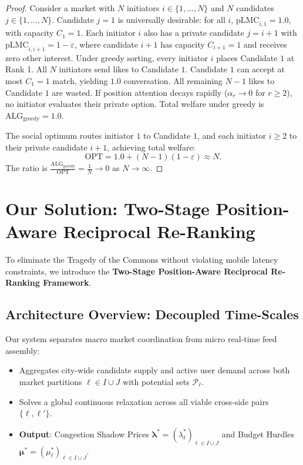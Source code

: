 \documentclass[11pt,letterpaper]{article}
\theoremstyle{definition}
\theoremstyle{plain}
\theoremstyle{remark}
\begin{document}
\begin{proof}
Consider a market with $N$ initiators $i \in \{1, \dots, N\}$ and $N$ candidates $j \in \{1, \dots, N\}$. 
Candidate $j=1$ is universally desirable: for all $i$, $\mathrm{pLMC}_{i, 1} = 1.0$, with capacity $C_1 = 1$.
Each initiator $i$ also has a private candidate $j = i+1$ with $\mathrm{pLMC}_{i, i+1} = 1 - \varepsilon$, where candidate $i+1$ has capacity $C_{i+1} = 1$ and receives zero other interest.
Under greedy sorting, every initiator $i$ places Candidate $1$ at Rank 1. All $N$ initiators send likes to Candidate $1$.
Candidate $1$ can accept at most $C_1 = 1$ match, yielding $1.0$ conversation. All remaining $N-1$ likes to Candidate $1$ are wasted. If position attention decays rapidly ($\alpha_r \to 0$ for $r \ge 2$), no initiator evaluates their private option. Total welfare under greedy is $\mathrm{ALG}_{\text{greedy}} = 1.0$.

The social optimum routes initiator $1$ to Candidate $1$, and each initiator $i \ge 2$ to their private candidate $i+1$, achieving total welfare:
\[
    \mathrm{OPT} = 1.0 + (N-1)(1 - \varepsilon) \approx N.
\]
The ratio is $\frac{\mathrm{ALG}_{\text{greedy}}}{\mathrm{OPT}} = \frac{1}{N} \to 0$ as $N \to \infty$.
\end{proof}

\newpage
\section{Our Solution: Two-Stage Position-Aware Reciprocal Re-Ranking}
\label{sec:solution}

To eliminate the Tragedy of the Commons without violating mobile latency constraints, we introduce the \textbf{Two-Stage Position-Aware Reciprocal Re-Ranking Framework}.

\subsection{Architecture Overview: Decoupled Time-Scales}
Our system separates macro market coordination from micro real-time feed assembly:

\begin{tcolorbox}[colback=blue!3!white,colframe=blue!60!black,arc=2mm,title=\textbf{STAGE 1: Offline Macro Planning (Batch Fluid LP --- Solved Hourly/Nightly)}]
\small
\begin{itemize}[leftmargin=1.5em]
    \item Aggregates city-wide candidate supply and active user demand across both market partitions $\ell \in I \cup J$ with potential sets $\mathcal{P}_\ell$.
    \item Solves a global continuous relaxation across all viable cross-side pairs $\{\ell, \ell'\}$.
    \item \textbf{Output}: Congestion Shadow Prices $\boldsymbol{\lambda}^* = (\lambda_\ell^*)_{\ell \in I \cup J}$ and Budget Hurdles $\boldsymbol{\mu}^* = (\mu_\ell^*)_{\ell \in I \cup J}$.
\end{itemize}
\end{tcolorbox}
\end{document}
